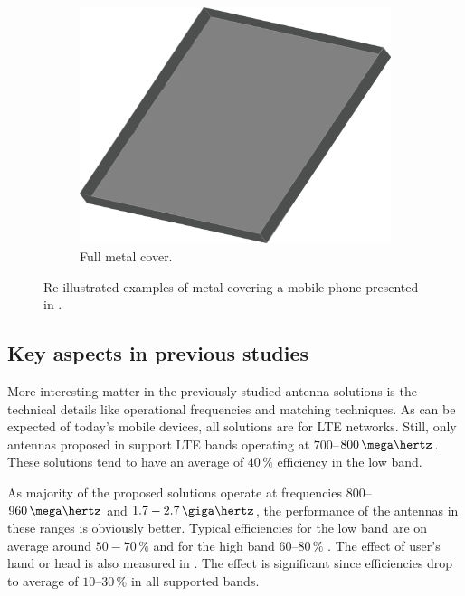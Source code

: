 \begin{figure}[H]
\begin{subfigure}[b]{0.3\textwidth}
        \includegraphics[width=\textwidth]{img/metal_cover_full.eps}
        \caption{Full metal cover.}
        \label{fig:full_cover}
    \end{subfigure}
    \caption{Re-illustrated examples of metal-covering a mobile phone presented in \cite{chen_compact_lte}.}
    \label{fig:metal_covers}
\end{figure}



\subsection{Key aspects in previous studies}
\label{sec:key_aspects}
More interesting matter in the previously studied antenna solutions is the technical details like operational frequencies and matching techniques. As can be expected of today's mobile devices, all solutions are for LTE networks. Still, only antennas proposed in \cite{stanley_lte_mimo, son_wideband_mimo, chen_compact_lte, chen_metal_frame,valkonen_multifeed} support LTE bands operating at $700$--$800\,\mega\hertz$. These solutions tend to have an average of $40\,\%$ efficiency in the low band. 

As majority of the proposed solutions operate at frequencies $800$--$960\,\mega\hertz$ and $1.7-2.7\,\giga\hertz$, the performance of the antennas in these ranges is obviously better. Typical efficiencies for the low band are on average around $50-70\,\%$ and for the high band $60$--$80\,\%$ \cite{ban_dual_loop,chen_compact_lte,son_wideband_mimo,chen_metal_frame,zhong_pier}. The effect of user's hand or head is also measured in \cite{zhong_pier, chen_metal_frame,ban_dual_loop,reconf_narrow,hybrid,hepta_ifa}. The effect is significant since efficiencies drop to average of $10$--$30\,\%$ in all supported bands. 

